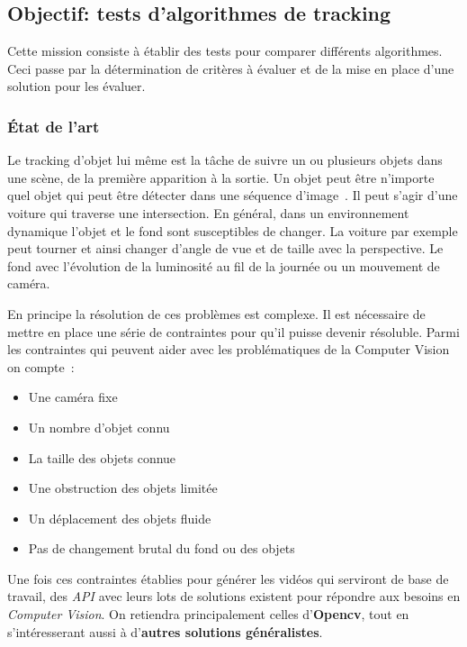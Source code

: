   \subsection{Objectif: tests d'algorithmes de tracking}
  
  Cette mission consiste à établir des tests pour comparer différents algorithmes. Ceci passe par la détermination de critères à évaluer et de la mise en place d'une solution pour les évaluer.
  
  \subsubsection{État de l'art}

    
      Le tracking d'objet lui même est la tâche de suivre un ou plusieurs objets dans une scène, de la première apparition à la sortie. Un objet peut être n'importe quel objet qui peut être détecter dans une séquence d'image~\cite{trackingSotA1}. Il peut s'agir d'une voiture qui traverse une intersection. En général, dans un environnement dynamique l'objet et le fond sont susceptibles de changer. La voiture par exemple peut tourner et ainsi changer d'angle de vue et de taille avec la perspective. Le fond avec l'évolution de la luminosité au fil de la journée ou un mouvement de caméra.
  
  En principe la résolution de ces problèmes est complexe. Il est nécessaire de mettre en place une série de contraintes pour qu'il puisse devenir résoluble. Parmi les contraintes qui peuvent aider avec les problématiques de la Computer Vision on compte~:
\begin{itemize}[noitemsep]
  \item Une caméra fixe
  \item Un nombre d'objet connu
  \item La taille des objets connue
  \item Une obstruction des objets limitée
  \item Un déplacement des objets fluide
  \item Pas de changement brutal du fond ou des objets
\end{itemize}
  
    Une fois ces contraintes établies pour générer les vidéos qui serviront de base de travail, des \textit{API} avec leurs lots de solutions existent pour répondre aux besoins en \textit{Computer Vision}. On retiendra principalement celles d'\textbf{Opencv}, tout en s’intéresserant aussi à d'\textbf{autres solutions généralistes}.
    

